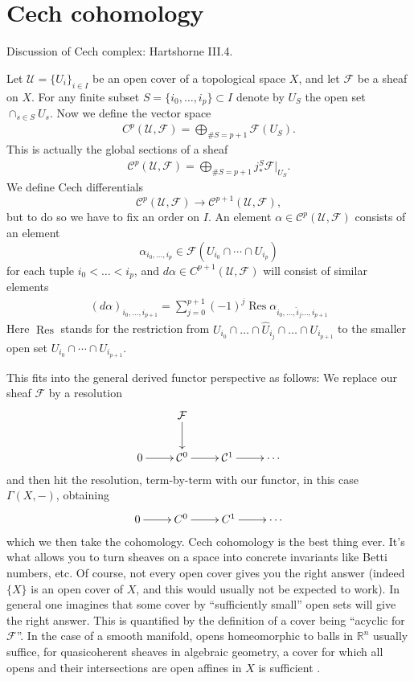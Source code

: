 \documentclass[12pt]{article}
\theoremstyle{plain}
\theoremstyle{definition}
\numberwithin{equation}{section}
\DeclareMathOperator{\res}{Res}
\newcommand{\R}{\mathbb{R}}
\newcommand{\CC}{\mathcal{C}}
\newcommand{\CF}{\mathcal{F}}
\newcommand{\CU}{\mathcal{U}}
\begin{document}
\section{Cech cohomology}\label{sec:cech}


Discussion of Cech complex: Hartshorne III.4.

Let $\CU = \{U_i\}_{i \in I}$ be an open cover of a topological space $X$, and let $\CF$ be a sheaf on $X$. For any finite subset $S = \{i_0, \ldots, i_p\} \subset I$ denote by $U_S$ the open set $\cap_{s \in S} U_s$. Now we define the vector space
\begin{align*}
C^p(\CU, \CF) = \bigoplus_{\# S = p+1} \CF(U_S).
\end{align*}
This is actually the global sections of a sheaf
\begin{align*}
\CC^p(\CU, \CF) = \bigoplus_{\# S = p+1} j^S_* \CF|_{U_S}.
\end{align*}
We define Cech differentials
\[
\CC^p(\CU, \CF) \rightarrow \CC^{p+1}(\CU, \CF),
\]
but to do so we have to fix an order on $I$. An element $\alpha \in \CC^p(\CU, \CF)$ consists of an element
\[
\alpha_{i_0, \ldots, i_p} \in \CF(U_{i_0} \cap \cdots \cap U_{i_p})
\]
for each tuple $i_0 < \ldots < i_p$, and $d\alpha \in C^{p+1}(\CU, \CF)$ will consist of similar elements
\begin{align*}
(d\alpha)_{i_0, \ldots, i_{p+1}} = \sum_{j=0}^{p+1} (-1)^j \res \alpha_{i_0, \ldots, \widehat{i}_j \ldots, i_{p+1}}
\end{align*}
Here $\res$ stands for the restriction from $U_{i_0} \cap \ldots \cap \widehat{U}_{i_j} \cap \ldots \cap U_{i_{p+1}}$ to the smaller open set $U_{i_0} \cap \cdots \cap U_{i_{p+1}}$.

This fits into the general derived functor perspective as follows: We replace our sheaf $\CF$ by a resolution
\begin{align*}
\xymatrix{
 & \CF \ar@{->}[d] & \\
%
0 \ar@{->}[r] & \CC^0 \ar@{->}[r] & \CC^1 \ar@{->}[r] & \cdots \\
}
\end{align*}
and then hit the resolution, term-by-term with our functor, in this case $\Gamma(X, -)$, obtaining
\begin{align*}
\xymatrix{
0 \ar@{->}[r] & C^0 \ar@{->}[r] & C^1 \ar@{->}[r] & \cdots \\
}
\end{align*}
which we then take the cohomology. Cech cohomology is the best thing ever. It's what allows you to turn sheaves on a space into concrete invariants like Betti numbers, etc. Of course, not every open cover gives you the right answer (indeed $\{X\}$ is an open cover of $X$, and this would usually not be expected to work). In general one imagines that some cover by ``sufficiently small'' open sets will give the right answer. This is quantified by the definition of a cover being ``acyclic for $\CF$''. In the case of a smooth manifold, opens homeomorphic to balls in $\R^n$ usually suffice, for quasicoherent sheaves in algebraic geometry, a cover for which all opens and their intersections are open affines in $X$ is sufficient {\cite[Lemma 30.2.6]{stacks-project}}.
\end{document}
